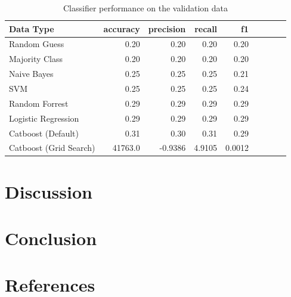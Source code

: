 \documentclass{article}
\begin{document}
	\begin{table}[h!]
		\centering
		\caption{Classifier performance on the validation data}
		\label{table:results_valid}
		
		\begin{tabular}{lrrrrrrrr}
			\toprule
			Data Type &     accuracy &     precision &     recall &    f1 \\
			\midrule
			Random Guess   &  0.20 &  0.20 &   0.20 &  0.20 \\
			Majority Class &    0.20 &  0.20 &   0.20 &   0.20 \\
			Naive Bayes       &   0.25 & 0.25 &  0.25 &  0.21 \\
			SVM      &   0.25 & 0.25 &  0.25 &  0.24 \\
			Random Forrest      &  0.29 & 0.29 & 0.29 &  0.29 \\
			Logistic Regression   &  0.29 & 0.29 &  0.29 &  0.29 \\
			Catboost (Default)   &  0.31 & 0.30 &  0.31 & 0.29 \\
			Catboost (Grid Search)   &  41763.0 & -0.9386 &  4.9105 &  0.0012 \\
			\bottomrule
		\end{tabular}
		
	\end{table}%


	\section{Discussion}
	
	\section{Conclusion}
	
	\section{References}
	
\printbibliography
\end{document}

